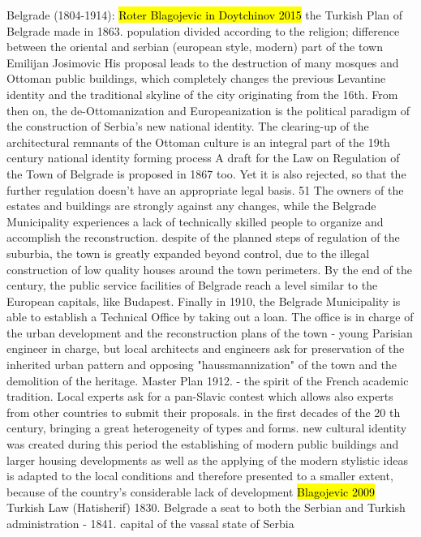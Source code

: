 \documentclass[11pt]{report}
\begin{document}
Belgrade (1804-1914):
	\hl{Roter Blagojevic in Doytchinov 2015}
the Turkish Plan of Belgrade made in 1863. population divided according to the religion; difference between the oriental and serbian (european style, modern) part of the town
Emilijan Josimovic
His  proposal  leads  to  the  destruction  of  many mosques and Ottoman public buildings, which completely changes the previous Levantine identity and the traditional skyline of the city originating from the 16th. From then on, the de-Ottomanization and Europeanization is the political paradigm of the construction of Serbia’s new national identity. The clearing-up of the architectural remnants of the Ottoman culture is an integral part of the 19th  century national identity forming process
A draft for the Law on Regulation of the Town of Belgrade is proposed in 1867 too. Yet it is also rejected, so that the further regulation doesn’t have an appropriate legal basis. 51  The owners of the estates and buildings are strongly against any changes, while the Belgrade Municipality experiences a lack of technically skilled people to organize and accomplish the reconstruction.
despite of the planned steps of regulation of the suburbia, the town 
is  greatly  expanded  beyond  control,  due  to  the  illegal  construction  of  low quality  houses  around  the  town  perimeters.
By the end of the century, the public service facilities of Belgrade reach a level similar to the European capitals, like Budapest.
Finally in 1910, the Belgrade Municipality is able to establish a Technical Office by taking out a loan. The office is in charge of the urban development and the reconstruction plans of the town - young Parisian engineer in charge, but local architects and engineers ask for preservation of the inherited urban pattern and opposing "haussmannization" of the town and the demolition of the heritage.
Master Plan 1912.  - the spirit of the French academic tradition. Local experts ask for a pan-Slavic contest which allows also experts from other countries to submit their proposals.
in the first decades of  the  20 th  century,  bringing  a  great heterogeneity  of  types  and  forms.
new cultural identity was created during this period
the  establishing of  modern  public  buildings  and  larger  housing developments as well as the applying of the modern stylistic ideas is adapted to the local conditions and therefore  presented  to  a  smaller  extent,  because of the country’s considerable lack of development
	\hl{Blagojevic 2009} 
Turkish Law (Hatisherif) 1830. Belgrade a seat to both the Serbian and Turkish administration - 1841. capital of the vassal state of Serbia
\end{document}
